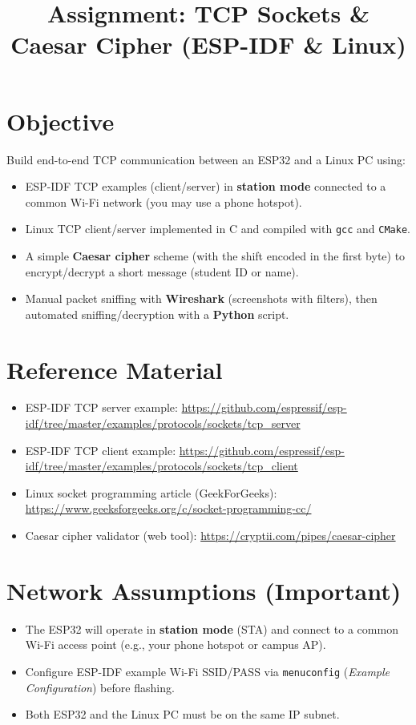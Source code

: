 \documentclass[11pt]{article}
\title{Assignment: TCP Sockets \& Caesar Cipher (ESP-IDF \& Linux)}
\author{}
\date{}
\begin{document}
\maketitle

\section*{Objective}
Build end-to-end TCP communication between an ESP32 and a Linux PC using:
\begin{itemize}
  \item ESP-IDF TCP examples (client/server) in \textbf{station mode} connected to a common Wi-Fi network (you may use a phone hotspot).
  \item Linux TCP client/server implemented in C and compiled with \texttt{gcc} and \texttt{CMake}.
  \item A simple \textbf{Caesar cipher} scheme (with the shift encoded in the first byte) to encrypt/decrypt a short message (student ID or name).
  \item Manual packet sniffing with \textbf{Wireshark} (screenshots with filters), then automated sniffing/decryption with a \textbf{Python} script.
\end{itemize}

\section*{Reference Material}
\begin{itemize}
  \item ESP-IDF TCP server example:
  \url{https://github.com/espressif/esp-idf/tree/master/examples/protocols/sockets/tcp_server}
  \item ESP-IDF TCP client example:
  \url{https://github.com/espressif/esp-idf/tree/master/examples/protocols/sockets/tcp_client}
  \item Linux socket programming article (GeekForGeeks):
  \url{https://www.geeksforgeeks.org/c/socket-programming-cc/}
  \item Caesar cipher validator (web tool):
  \url{https://cryptii.com/pipes/caesar-cipher}
\end{itemize}

\section*{Network Assumptions (Important)}
\begin{itemize}
  \item The ESP32 will operate in \textbf{station mode} (STA) and connect to a common Wi-Fi access point (e.g., your phone hotspot or campus AP).
  \item Configure ESP-IDF example Wi-Fi SSID/PASS via \texttt{menuconfig} (\textit{Example Configuration}) before flashing.
  \item Both ESP32 and the Linux PC must be on the same IP subnet.
\end{itemize}
\end{document}
